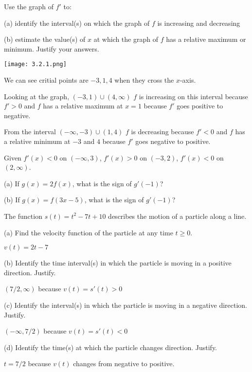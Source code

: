 \documentclass[../bccalc.tex]{subfiles}
\begin{document}
\begin{example}
    Use the graph of $f'$ to: 

    (a) identify the interval(s) on which the graph of $f$ is increasing and decreasing 

    (b) estimate the value(s) of $x$ at which the graph of $f$ has a relative maximum or minimum. Justify your answers.

    \begin{center}
        \texttt{[image: 3.2.1.png]}
    \end{center}

    We can see critial points are $-3,1,4$ when they cross the $x$-axis.

    Looking at the graph, $(-3,1)\cup (4,\infty)$ $f$ is increasing on this interval because $f'>0$ and $f$ has a relative maximum at $x=1$ because $f'$ goes positive to negative.

    From the interval $(-\infty,-3)\cup (1,4)$ $f$ is decreasing because $f'<0$ and $f$ has a relative minimum at $-3$ and $4$ because $f'$ goes negative to positive. 
\end{example}

\ex Given $f'(x)<0$ on $(-\infty,3)$, $f'(x)>0$ on $(-3,2)$, $f'(x)<0$ on $(2,\infty)$. 

(a) If $g(x)=2f(x)$, what is the sign of $g'(-1)$?

(b) If $g(x)=f(3x-5)$, what is the sign of $g'(-1)$?

\pagebreak
\begin{example}
    The function $s(t)=t^2-7t+10$ describes the motion of a particle along a line.

(a) Find the velocity function of the particle at any time $t\geq 0$.

$v(t)=2t-7$

(b) Identify the time interval(s) in which the particle is moving in a positive direction. Justify.

$(7/2,\infty)$ because $v(t)=s'(t)>0$

(c) Identify the interval(s) in which the particle is moving in a negative direction. Justify.

$(-\infty,7/2)$ because $v(t)=s'(t)<0$

(d) Identify the time(s) at which the particle changes direction. Justify.

$t=7/2$ because $v(t)$ changes from negative to positive.
\end{example}
\end{document}
